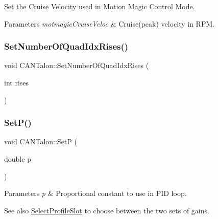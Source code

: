 Set the Cruise Velocity used in Motion Magic Control Mode. 
\begin{DoxyParams}{Parameters}
{\em motmagic\+Cruise\+Veloc} & Cruise(peak) velocity in R\+PM. \\
\hline
\end{DoxyParams}
\mbox{\label{class_c_a_n_talon_a3d886b434c2e8c99415bd798f9ec1dc4}} 
\subsubsection{\texorpdfstring{Set\+Number\+Of\+Quad\+Idx\+Rises()}{SetNumberOfQuadIdxRises()}}
{\footnotesize\ttfamily void C\+A\+N\+Talon\+::\+Set\+Number\+Of\+Quad\+Idx\+Rises (\begin{DoxyParamCaption}\item[{int}]{rises }\end{DoxyParamCaption})}

\mbox{\label{class_c_a_n_talon_a6a8c44252d104634d6a0c580088cbf98}} 
\subsubsection{\texorpdfstring{Set\+P()}{SetP()}}
{\footnotesize\ttfamily void C\+A\+N\+Talon\+::\+SetP (\begin{DoxyParamCaption}\item[{double}]{p }\end{DoxyParamCaption})\hspace{0.3cm}{\ttfamily [override]}}


\begin{DoxyParams}{Parameters}
{\em p} & Proportional constant to use in P\+ID loop. \\
\hline
\end{DoxyParams}
\begin{DoxySeeAlso}{See also}
\hyperlink{class_c_a_n_talon_a0f478462884ed5e541179821c44b724f}{Select\+Profile\+Slot} to choose between the two sets of gains. 
\end{DoxySeeAlso}
\mbox{\label{class_c_a_n_talon_ae6454fc74fcdf5b8afa8da07d08f0290}} 
